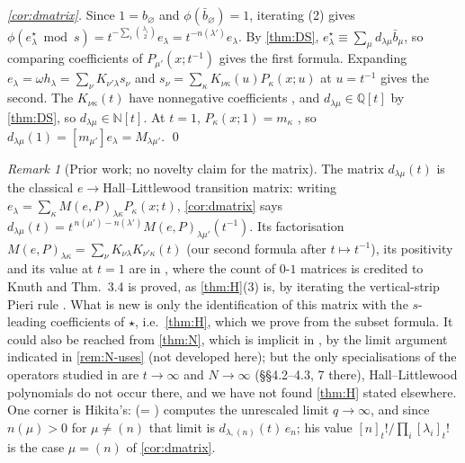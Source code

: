 \documentclass[11pt]{amsart}
\theoremstyle{definition}
\theoremstyle{remark}
\newtheorem{remark}[theorem]{Remark}
\numberwithin{equation}{section}
\begin{document}
\emph{\cref{cor:dmatrix}.} Since $1=b_\varnothing$ and $\phi(\bar b_\varnothing)=1$, iterating (2) gives $\phi(e^\star_\lambda\bmod s)=t^{-\sum_i\binom{\lambda_i}2}e_\lambda=t^{-n(\lambda')}e_\lambda$. By \cref{thm:DS}, $e^\star_\lambda\equiv\sum_\mu d_{\lambda\mu}\bar b_\mu$, so comparing coefficients of $P_{\mu'}(x;t^{-1})$ gives the first formula. Expanding $e_\lambda=\omega h_\lambda=\sum_\nu K_{\nu'\lambda}s_\nu$ \cite[I \S6]{Macdonald95} and $s_\nu=\sum_\kappa K_{\nu\kappa}(u)P_\kappa(x;u)$ \cite[III (2.6)]{Macdonald95} at $u=t^{-1}$ gives the second. The $K_{\nu\kappa}(t)$ have nonnegative coefficients \cite[III (6.5)]{Macdonald95}, and $d_{\lambda\mu}\in\mathbb{Q}[t]$ by \cref{thm:DS}, so $d_{\lambda\mu}\in\mathbb{N}[t]$. At $t=1$, $P_\kappa(x;1)=m_\kappa$ \cite[III \S2]{Macdonald95}, so $d_{\lambda\mu}(1)=[m_{\mu'}]e_\lambda=M_{\lambda\mu'}$. \qed

\begin{remark}[Prior work; no novelty claim for the matrix]\label{rem:H}
The matrix $d_{\lambda\mu}(t)$ is the classical $e\to$Hall--Littlewood transition matrix: writing $e_\lambda=\sum_\kappa M(e,P)_{\lambda\kappa}P_\kappa(x;t)$, \cref{cor:dmatrix} says $d_{\lambda\mu}(t)=t^{\,n(\mu')-n(\lambda')}M(e,P)_{\lambda\mu'}(t^{-1})$. Its factorisation $M(e,P)_{\lambda\kappa}=\sum_\nu K_{\nu\lambda}K_{\nu'\kappa}(t)$ (our second formula after $t\mapsto t^{-1}$), its positivity and its value at $t=1$ are in \cite[\S3.2, Thm.~3.4]{Kirillov98}, where the count of $0$-$1$ matrices is credited to Knuth and Thm.~3.4 is proved, as \cref{thm:H}(3) is, by iterating the vertical-strip Pieri rule \cite[III (3.2)]{Macdonald95} \cite[\S4.1]{Kirillov98}. What is new is only the identification of this matrix with the $s$-leading coefficients of $\star$, i.e.\ \cref{thm:H}, which we prove from the subset formula. It could also be reached from \cref{thm:N}, which is implicit in \cite{DFK19}, by the limit argument indicated in \cref{rem:N-uses} (not developed here); but the only specialisations of the operators studied in \cite{DFK19} are $t\to\infty$ and $N\to\infty$ (\S\S4.2--4.3, 7 there), Hall--Littlewood polynomials do not occur there, and we have not found \cref{thm:H} stated elsewhere. One corner is Hikita's: \cite[Lemma~6.3]{Hikita25} (= \cite[Thm.~C(ii)]{Hikita25}) computes the unrescaled limit $q\to\infty$, and since $n(\mu)>0$ for $\mu\ne(n)$ that limit is $d_{\lambda,(n)}(t)\,e_n$; his value $[n]_t!/\prod_i[\lambda_i]_t!$ is the case $\mu=(n)$ of \cref{cor:dmatrix}.
\end{remark}
\end{document}
